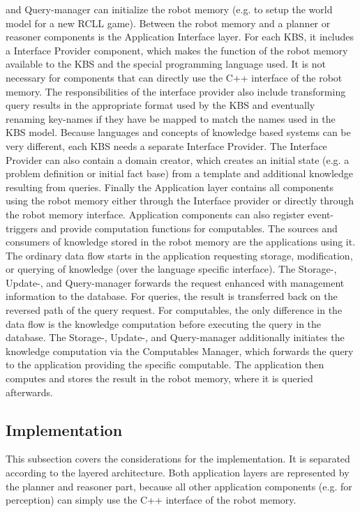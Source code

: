 \documentclass[a4paper,11pt]{article}
\begin{document}
and Query-manager can initialize the robot memory (e.g. to setup the
world model for a new RCLL game).
Between the robot memory and a planner or reasoner components is the
Application Interface layer. For each KBS, it includes a
Interface Provider component, which makes the function of the robot
memory available to the KBS and the special programming language
used. It is not necessary for components that can directly use the C++
interface of the robot memory. The responsibilities of the interface
provider also include transforming query results in the appropriate
format used by the KBS and eventually renaming key-names if they
have be mapped to match the names used in the KBS
model. Because languages and concepts of knowledge based systems can be
very different, each KBS needs a separate Interface
Provider. The Interface Provider can also contain a domain creator,
which creates an initial state (e.g. a problem definition or initial
fact base) from a template and additional knowledge resulting from
queries. Finally the Application layer contains all components using
the robot memory either through the Interface provider or directly
through the robot memory interface. Application components can also
register event-triggers and provide computation functions for
computables. The sources and consumers of knowledge stored in the
robot memory are the applications using it. The ordinary data flow
starts in the application requesting storage, modification, or
querying of knowledge (over the language specific interface). The
Storage-, Update-, and Query-manager forwards the request enhanced
with management information to the database. For queries, the result
is transferred back on the reversed path of the query request. For
computables, the only difference in the data flow is the knowledge
computation before executing the query in the database. The Storage-,
Update-, and Query-manager additionally initiates the knowledge
computation via the Computables Manager, which forwards the query to
the application providing the specific computable. The application
then computes and stores the result in the robot memory, where it is
queried afterwards.


\subsection{Implementation}
\label{sec:impl}
This subsection covers the considerations for the implementation. It is
separated according to the layered architecture. Both application
layers are represented by the planner and reasoner part, because all
other application components (e.g. for perception) can simply use the
C++ interface of the robot memory.
\end{document}
